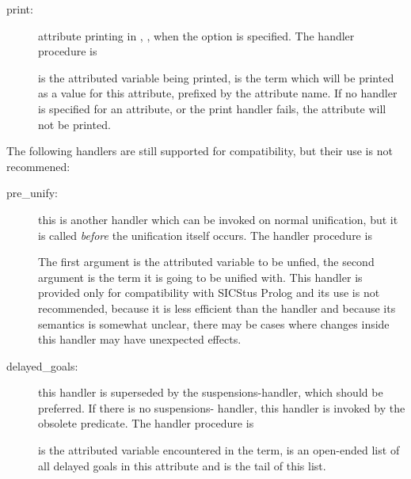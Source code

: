 \begin{description}
\item [print:]
  attribute printing in
,%
,%
%
when the  option is specified.
The handler procedure is
\begin{quote}
\end{quote}
 is the attributed variable being printed, 
is the term which will be printed as a value for this attribute,
prefixed by the attribute name.
If no handler is specified for an attribute, or the print handler fails,
the attribute will not be printed.

\end{description}

The following handlers are still supported for compatibility,
but their use is not recommened:
\begin{description}
\item [pre_unify:]
  this is another handler which can be invoked on
normal unification, but it is called \emph{before} the unification
itself occurs.
The handler procedure is
\begin{quote}
\end{quote}
The first argument is the attributed variable to be unfied,
the second argument is the term it is going to be unified with.
This handler is provided only for compatibility with SICStus Prolog
and its use is not recommended, because it is less efficient
than the  handler and because its semantics is somewhat
unclear, there may be cases where changes inside this handler
may have unexpected effects.

\item [delayed_goals:]
  this handler is superseded by the
suspensions-handler, which should be preferred. If there is no suspensions-
handler, this handler is invoked by the obsolete
predicate.
The handler procedure is
\begin{quote}
\end{quote}
 is the attributed variable encountered in the
term,  is an open-ended list of all delayed
goals in this attribute and  is the
tail of this list.

\end{description}

